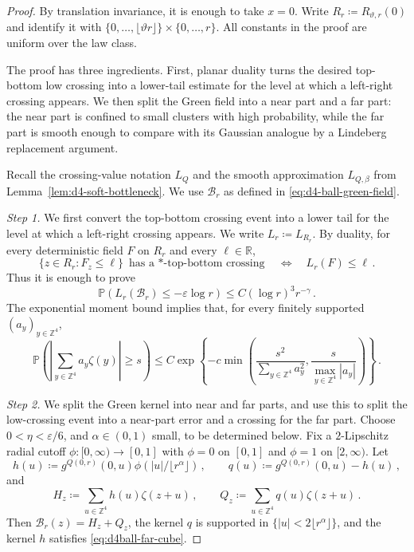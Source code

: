 \documentclass[11pt]{amsart}
\theoremstyle{plain}
\theoremstyle{definition}
\newcommand{\Z}{\mathbb{Z}}
\newcommand{\R}{\mathbb{R}}
\renewcommand{\P}{\mathbb{P}}
\begin{document}
\begin{proof}
By translation invariance, it is enough to take $x=0$. Write $R_r\coloneqq R_{\vartheta,r}(0)$ and identify it with $\{0,\ldots,\lfloor\vartheta r\rfloor\}\times\{0,\ldots,r\}$. All constants in
the proof are uniform over the law class.

The proof has three ingredients. First, planar duality turns the desired
top-bottom low crossing into a lower-tail estimate for the level at which a
left-right crossing appears. We then split the Green field into a near part
and a far part: the near part is confined to small clusters with high
probability, while the far part is smooth enough to compare with its Gaussian
analogue by a Lindeberg replacement argument.

Recall the crossing-value notation $L_Q$ and the smooth approximation
$L_{Q,\beta}$ from Lemma~\ref{lem:d4-soft-bottleneck}.
We use $\mathcal B_r$ as defined in \eqref{eq:d4-ball-green-field}.

\smallskip
\noindent\emph{Step 1.} We first convert the top-bottom crossing event into a lower tail for the level
at which a left-right crossing appears. We write $L_r\coloneqq L_{R_r}$. By duality, for every deterministic field $F$ on $R_r$ and
every $\ell\in\R$,
\begin{equation}\label{eq:d4ball-duality}
    \{z\in R_r:F_z\leq\ell\}\text{ has a $\ast$-top-bottom crossing}
    \quad\Longleftrightarrow\quad
    L_r(F)\leq\ell\, .
\end{equation}
Thus it is enough to prove
\[
    \P\left(L_r(\mathcal B_r)\leq -\varepsilon\log r\right)
    \leq C(\log r)^3r^{-\gamma}\, .
\]
	The exponential moment bound implies that, for every finitely supported
	$(a_y)_{y\in\Z^4}$,
	\begin{equation}\label{eq:d4ball-linear-exp}
	    \P\left(\left|\sum_{y\in\Z^4} a_y\zeta(y)\right|\geq s\right)
	    \leq
	    C\exp\left\{
	    -c\min\left(
	    \frac{s^2}{\sum_{y\in\Z^4}a_y^2},
	    \frac{s}{\max_{y\in\Z^4}|a_y|}
	    \right)
	    \right\}\, .
	\end{equation}

\smallskip
	\noindent\emph{Step 2.} We split the Green kernel into near and far parts, and use this to split
	the low-crossing event into a near-part error and a crossing for the far part. Choose
	$0<\eta<\varepsilon/6$, and $\alpha\in(0,1)$ small, to be determined below.
	Fix a $2$-Lipschitz radial cutoff
	$\phi:[0,\infty)\to[0,1]$ with $\phi=0$ on $[0,1]$ and $\phi=1$ on
	$[2,\infty)$. Let
	\[
	    h(u)\coloneqq g^{Q(0,r)}(0,u)\phi(|u|/\lfloor r^\alpha\rfloor)\, ,
	    \qquad
	    q(u)\coloneqq g^{Q(0,r)}(0,u)-h(u)\, ,
	\]
	and
	\[
	    H_z\coloneqq\sum_{u\in\Z^4} h(u)\zeta(z+u)\, ,
	    \qquad
	    Q_z\coloneqq\sum_{u\in\Z^4} q(u)\zeta(z+u)\, .
	\]
Then $\mathcal B_r(z)=H_z+Q_z$, the kernel $q$ is supported in
$\{|u|<2\lfloor r^\alpha\rfloor\}$, and the kernel $h$ satisfies
\eqref{eq:d4ball-far-cube}.


\end{proof}
\end{document}
